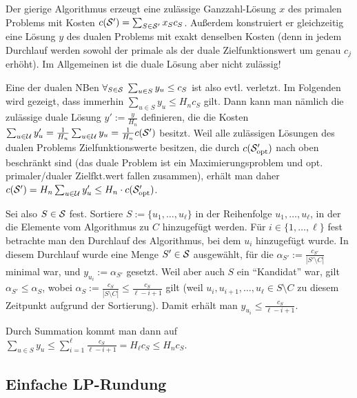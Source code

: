 \begin{Beweis}
    Der gierige Algorithmus erzeugt eine zulässige Ganzzahl-Lösung $x$ des primalen Problems
    mit Kosten $c(\S') = \sum_{S \in \S'} x_S c_S$.
    Außerdem konstruiert er gleichzeitig eine Lösung $y$ des dualen Problems mit
    exakt denselben Kosten
    (denn in jedem Durchlauf werden sowohl der primale als der duale Zielfunktionswert um
    genau $c_j$ erhöht).
    Im Allgemeinen ist die duale Lösung aber nicht zulässig!

    Eine der dualen NBen $\forall_{S \in \S}\; \sum_{u \in S} y_u \le c_S$
    ist also evtl. verletzt.
    Im Folgenden wird gezeigt, dass immerhin $\sum_{u \in S} y_u \le H_n c_S$ gilt.
    Dann kann man nämlich die zulässige duale Lösung $y' := \frac{y}{H_n}$ definieren,
    die die Kosten $\sum_{u \in \U} y_u' = \frac{1}{H_n} \sum_{u \in \U} y_u =
    \frac{1}{H_n} c(\S')$ besitzt.
    Weil alle zulässigen Lösungen des dualen Problems Zielfunktionswerte besitzen,
    die durch $c(\S_\opt')$ nach oben beschränkt sind
    (das duale Problem ist ein Maximierungsproblem und
    opt. primaler/dualer Zielfkt.wert fallen zusammen),
    erhält man daher
    $c(\S') = H_n \sum_{u \in \U} y_u' \le H_n \cdot c(\S_\opt')$.

    Sei also $S \in \S$ fest.
    Sortiere $S := \{u_1, \dotsc, u_\ell\}$ in der Reihenfolge $u_1, \dotsc, u_\ell$,
    in der die Elemente vom Algorithmus zu $C$ hinzugefügt werden.
    Für $i \in \{1, \dotsc, \ell\}$ fest betrachte man den Durchlauf des Algorithmus, bei dem
    $u_i$ hinzugefügt wurde.
    In diesem Durchlauf wurde eine Menge $S' \in \S$ ausgewählt, für die
    $\alpha_{S'} := \frac{c_{S'}}{|S' \setminus C|}$ minimal war, und $y_{u_i} := \alpha_{S'}$
    gesetzt.
    Weil aber auch $S$ ein "`Kandidat"' war, gilt $\alpha_{S'} \le \alpha_S$,
    wobei $\alpha_S := \frac{c_S}{|S \setminus C|} \le \frac{c_S}{\ell - i + 1}$ gilt
    (weil $u_i, u_{i+1}, \dotsc, u_\ell \in S \setminus C$ zu diesem Zeitpunkt aufgrund der
    Sortierung).
    Damit erhält man $y_{u_i} \le \frac{c_S}{\ell - i + 1}$.

    Durch Summation kommt man dann auf
    $\sum_{u \in S} y_u \le
    \sum_{i=1}^\ell \frac{c_S}{\ell - i + 1} = H_\ell c_S \le H_n c_S$.
\end{Beweis}

\pagebreak

\subsection{%
    Einfache LP-Rundung%
}

